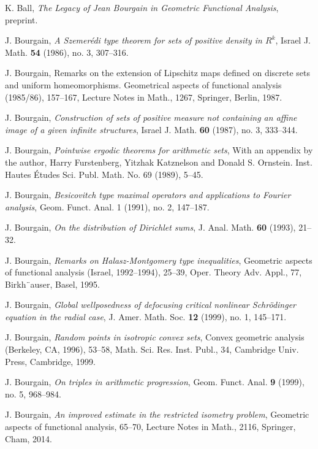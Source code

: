 \documentclass[12pt,a4paper,reqno]{amsart}
\numberwithin{equation}{section}
\theoremstyle{plain}
\theoremstyle{definition}
\begin{document}
\begin{thebibliography}{10}

K. Ball, \emph{The Legacy of Jean Bourgain in Geometric Functional Analysis}, preprint.

J. Bourgain, \emph{A Szemer\'edi type theorem for sets of positive density in $R^k$}, Israel J. Math. \textbf{54} (1986), no. 3, 307--316.

J. Bourgain, Remarks on the extension of Lipschitz maps defined on discrete sets and uniform homeomorphisms. Geometrical aspects of functional analysis (1985/86), 157–167, Lecture Notes in Math., 1267, Springer, Berlin, 1987.

J. Bourgain, \emph{Construction of sets of positive measure not containing an affine image of a given infinite structures}, Israel J. Math. \textbf{60} (1987), no. 3, 333--344.


J. Bourgain, \emph{Pointwise ergodic theorems for arithmetic sets}, With an appendix by the author, Harry Furstenberg, Yitzhak Katznelson and Donald S. Ornstein. Inst. Hautes Études Sci. Publ. Math. No. 69 (1989), 5--45.

J. Bourgain, \emph{Besicovitch type maximal operators and applications to Fourier analysis}, Geom. Funct. Anal. 1 (1991), no. 2, 147--187.

J. Bourgain, \emph{On the distribution of Dirichlet sums}, J. Anal. Math. \textbf{60} (1993), 21--32.

J. Bourgain, \emph{Remarks on Halasz-Montgomery type inequalities}, Geometric aspects
of functional analysis (Israel, 1992–1994), 25–39, Oper. Theory Adv. Appl., 77,
Birkh¨auser, Basel, 1995.

J. Bourgain, \emph{Global wellposedness of defocusing critical nonlinear Schr\"odinger equation in the radial case}, J. Amer. Math. Soc. \textbf{12} (1999), no. 1, 145--171.

J. Bourgain, \emph{Random points in isotropic convex sets}, Convex geometric analysis (Berkeley, CA, 1996), 53--58,
Math. Sci. Res. Inst. Publ., 34, Cambridge Univ. Press, Cambridge, 1999.

J. Bourgain, \emph{On triples in arithmetic progression}, Geom. Funct. Anal. \textbf{9} (1999), no. 5, 968--984.

J. Bourgain, \emph{An improved estimate in the restricted isometry problem}, Geometric aspects of functional analysis, 65--70, Lecture Notes in Math., 2116, Springer, Cham, 2014.



\end{thebibliography}
\end{document}
